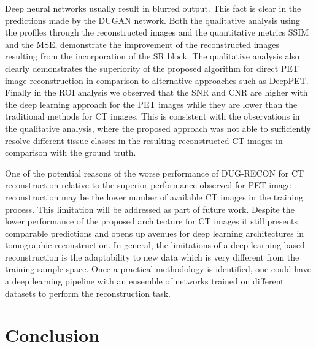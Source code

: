 Deep neural networks usually result in blurred output.  This fact is clear in the predictions made by the \ac{DUGAN} network. Both the qualitative analysis using the profiles through the reconstructed images and the quantitative metrics  \ac{SSIM} and the \ac{MSE}, demonstrate the improvement of the reconstructed images resulting from the incorporation of the SR block. The qualitative analysis also clearly demonstrates the superiority of the proposed algorithm for direct PET image reconstruction in comparison to alternative approaches such as DeepPET. Finally in the \ac{ROI} analysis we observed that the \ac{SNR} and \ac{CNR} are higher with the deep learning approach for the \ac{PET} images while they are lower than the traditional methods for \ac{CT} images. This is consistent with the observations in the qualitative analysis, where the proposed approach was not able to sufficiently resolve different tissue classes in the resulting reconstructed CT images in comparison with the ground truth. 

One of the potential reasons of the worse performance of DUG-RECON for CT reconstruction relative to the superior performance observed for PET image reconstruction may be the lower number of available CT images in the training process. This limitation will be addressed as part of future work. 
Despite the lower performance of the proposed architecture for CT images it still presents comparable predictions and opens up avenues for deep learning architectures in tomographic reconstruction.
In general, the limitations of a deep learning based reconstruction is the adaptability to new data which is very different from the training sample space. Once a practical methodology is identified, one could have a deep learning pipeline with an ensemble of networks trained on different datasets to perform the reconstruction task. 


\section{Conclusion}

